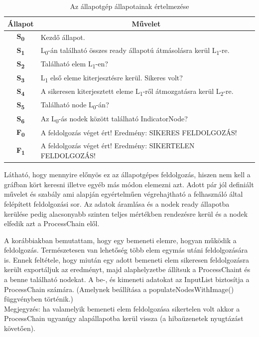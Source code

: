 \documentclass[a4paper,12pt,oneside]{report}
\begin{document}
\begin{table}[h]
\begin{tabular}{p{1cm}|p{12cm}}

\toprule
\multicolumn{1}{c|}{\textbf{Állapot}} & \multicolumn{1}{|c}{\textbf{Művelet}} \\ \midrule
\multicolumn{1}{c|}{\textbf{S\textsubscript{0}}}  & Kezdő állapot. \\
\hline
\multicolumn{1}{c|}{\textbf{S\textsubscript{1}}}  &  L\textsubscript{0}-án található összes ready állapotú átmásolásra kerül L\textsubscript{1}-re.\\
\hline
\multicolumn{1}{c|}{\textbf{S\textsubscript{2}}}  & Található elem L\textsubscript{1}-en? \\
\hline
\multicolumn{1}{c|}{\textbf{S\textsubscript{3}}}  & L\textsubscript{1} első eleme kiterjesztésre kerül. Sikeres volt?  \\
\hline
\multicolumn{1}{c|}{\textbf{S\textsubscript{4}}}  & A sikeresen kiterjesztett eleme L\textsubscript{1}-ről átmozgatásra kerül L\textsubscript{2}-re.  \\
\hline
\multicolumn{1}{c|}{\textbf{S\textsubscript{5}}}  & Található node L\textsubscript{0}-án? \\
\hline
\multicolumn{1}{c|}{\textbf{S\textsubscript{6}}} & Az L\textsubscript{0}-ás nodek között található IndicatorNode? \\
\hline
\multicolumn{1}{c|}{\textbf{F\textsubscript{0}}} &  A feldolgozás véget ért! Eredmény: SIKERES FELDOLGOZÁS!\\
\hline
\multicolumn{1}{c|}{\textbf{F\textsubscript{1}}} & A feldolgozás véget ért! Eredmény: SIKERTELEN FELDOLGOZÁS! \\
\hline
\end{tabular}
\caption{Az állapotgép állapotainak értelmezése }
\label{table:nonfunct_req_table}
\end{table}

Látható, hogy mennyire előnyös ez az állapotgépes feldolgozás, hiszen nem kell a gráfban kört keresni illetve egyéb más módon elemezni azt. Adott pár jól definiált művelet és szabály ami alapján egyértelműen végrehajtható a felhasználó által felépített feldolgozási sor. Az adatok áramlása és a nodek ready állapotba kerülése pedig alacsonyabb szinten teljes mértékben rendezésre kerül és a nodek elfedik azt a ProcessChain elől.

A korábbiakban bemutattam, hogy egy bemeneti elemre, hogyan működik a feldolgozás. Természetesen van lehetőség több elem egymás utáni feldolgozására is. Ennek feltétele, hogy miután egy adott bemeneti elem sikeresen feldolgozásra került exportáljuk az eredményt, majd alaphelyzetbe állítsuk a ProcessChaint és a benne található nodekat. A be-, és kimeneti adatokat az InputList biztosítja a ProcessChain számára. (Amelynek beállítása a populateNodesWithImage() függvényben történik.)\\
Megjegyzés: ha valamelyik bemeneti elem feldolgozása sikertelen volt akkor a ProcessChain ugyanúgy alapállapotba kerül vissza (a hibaüzenetek nyugtázást követően).
\end{document}
